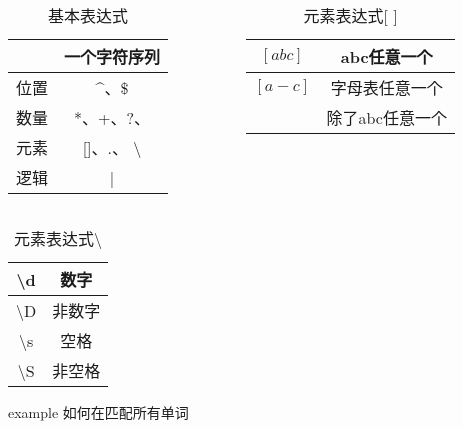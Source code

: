 \documentclass{beamer}
\begin{document}
\begin{frame}[t]
	\begin{columns}

		\begin{column}{0.5\textwidth}
			\begin{table}[htpb]
				\centering
				\caption{基本表达式}
				\label{tab:label}
				\begin{tabular}{|c|c|}
					\hline
					\[\] & 一个字符序列                 \\
					\hline
					位置   & $\^$、\$                \\
					\hline
					数量   & *、+、?、{}               \\
					\hline
					元素   & []、$.$、 \textbackslash \\
					\hline
					逻辑   & |                      \\
					\hline
				\end{tabular}
			\end{table}
		\end{column}
		\pause
		\begin{column}{0.5\textwidth}
			\begin{table}[htpb]
				\centering
				\caption{元素表达式[   ]}
				\label{tab:label}

				\begin{tabular}{|c|c|}
					\hline
					$[abc]$    & abc任意一个   \\
					\hline
					$[a-c]$    & 字母表任意一个   \\
					\hline
					[ $\^$abc] & 除了abc任意一个 \\
					\hline
				\end{tabular}
			\end{table}

		\end{column}

	\end{columns}
	\pause
	\begin{table}[htpb]
		\centering
		\caption{元素表达式\textbackslash}
		\label{tab:label}

		\begin{tabular}{|c|c|}
			\hline
			\textbackslash d & 数字\\
			\hline
			\textbackslash D & 非数字\\
			\hline
			\textbackslash s & 空格\\
			\hline
			\textbackslash S & 非空格\\
			\hline
		\end{tabular}
	\end{table}
\end{frame}

\begin{frame}[t]
	\begin{block}{example}
	如何在匹配所有单词	
	\end{block}
	
\end{frame}
\end{document}
